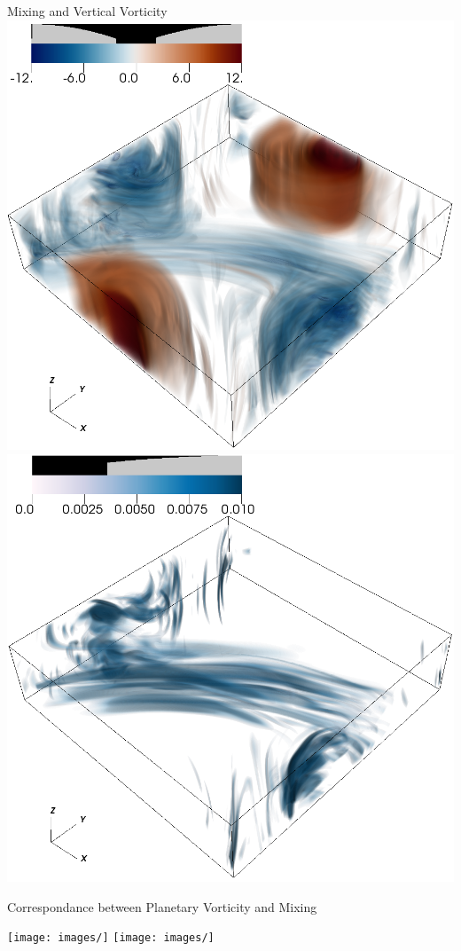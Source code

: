 \documentclass[aspecttatio=169]{beamer}
\begin{document}
\begin{frame}{Mixing and Vertical Vorticity}
        \includegraphics[width=.95\textwidth]{images/vortz_Om10_vr2.png}
        \includegraphics[width=.95\textwidth]{images/chi_Om10_vr2.png}
    \emp

\end{frame}

\begin{frame}{Correspondance between Planetary Vorticity and Mixing}

    \texttt{[image: images/]}
    \texttt{[image: images/]}

\end{frame}
\end{document}
